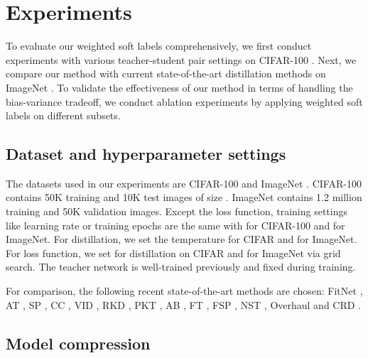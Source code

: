 \documentclass{article} \usepackage{iclr2021_conference,times}
\begin{document}
\vspace{-5pt}
\section{Experiments}
\vspace{-5pt}
To evaluate our weighted soft labels comprehensively, we first conduct experiments with various teacher-student pair settings on CIFAR-100 \citep{krizhevsky2009learning}. Next, we compare our method with current state-of-the-art distillation methods on ImageNet \citep{deng2009imagenet}. 
To validate the effectiveness of our method in terms of handling the bias-variance tradeoff, we conduct ablation experiments by applying weighted soft labels on different subsets. 


\subsection{Dataset and hyperparameter settings}
The datasets used in our experiments are CIFAR-100 \citep{krizhevsky2009learning} and ImageNet \citep{deng2009imagenet}. CIFAR-100 contains 50K training and 10K test images of size . ImageNet contains 1.2 million training and 50K validation images. Except the loss function, training settings like learning rate or training epochs are the same with \citet{Tian2020Contrastive} for CIFAR-100 and \citet{heo2019comprehensive} for ImageNet. For distillation, we set the temperature  for CIFAR and  for ImageNet. For loss function, we set  for distillation on CIFAR and  for ImageNet via grid search. The teacher network is well-trained previously and fixed during training.

For comparison, the following recent state-of-the-art methods are chosen: FitNet \citep{RomeroBKCGB14}, AT \citep{ZagoruykoK17}, SP \citep{tung2019similarity}, CC \citep{peng2019correlation}, VID \citep{ahn2019variational}, RKD \citep{park2019relational}, PKT \citep{passalis2018learning}, AB \citep{heo2019comprehensive}, FT \citep{kim2018paraphrasing}, FSP \citep{yim2017gift}, NST \citep{huang2017like}, Overhaul \citep{heo2019comprehensive} and CRD \citep{Tian2020Contrastive}.

\subsection{Model compression}
\end{document}
